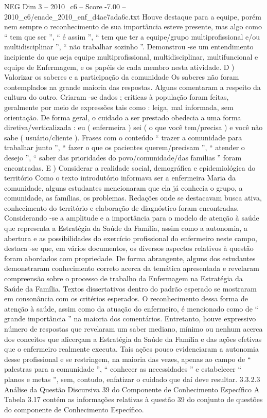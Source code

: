 \begin{textsample}{NEG Dim 3 – 2010\_c6 – Score -7.00 – 2010\_c6/enade\_2010\_enf\_d4ae7ada6c.txt}
Houve destaque para a equipe, porém nem sempre o reconhecimento de sua importância esteve presente, mas algo como “ tem que ser ”, “ é assim ”, “ tem que ter a equipe/grupo multiprofissional e/ou multidisciplinar ”, “ não trabalhar sozinho ”.
Demonstrou -se um entendimento incipiente do que seja equipe multiprofissional, multidisciplinar, multifuncional e equipe de Enfermagem, e os papéis de cada membro nesta atividade.
D ) Valorizar os saberes e a participação da comunidade Os saberes não foram contemplados na grande maioria das respostas.
Alguns comentaram a respeito da cultura do outro.
Criaram -se dados ; críticas à população foram feitas, geralmente por meio de expressões tais como : leiga, mal informada, sem orientação.
De forma geral, o cuidado a ser prestado obedecia a uma forma diretiva/verticalizada : eu ( enfermeira ) sei ( o que você tem/precisa ) e você não sabe ( usuário/cliente ).
Frases com o conteúdo “ trazer a comunidade para trabalhar junto ”, “ fazer o que os pacientes querem/precisam ”, “ atender o desejo ”, “ saber das prioridades do povo/comunidade/das famílias ” foram encontradas.
E ) Considerar a realidade social, demográfica e epidemiológica do território Como o texto introdutório informava ser a enfermeira Maria da comunidade, alguns estudantes mencionaram que ela já conhecia o grupo, a comunidade, as famílias, os problemas.
Redações onde se destacavam busca ativa, conhecimento do território e elaboração de diagnóstico foram encontradas.
Considerando -se a amplitude e a importância para o modelo de atenção à saúde que representa a Estratégia da Saúde da Família, assim como a autonomia, a abertura e as possibilidades do exercício profissional do enfermeiro neste campo, destaca -se que, em vários documentos, os diversos aspectos relativos à questão foram abordados com propriedade.
De forma abrangente, alguns dos estudantes demonstraram conhecimento correto acerca da temática apresentada e revelaram compreensão sobre o processo de trabalho da Enfermagem na Estratégia da Saúde da Família.
Textos dissertativos dentro do padrão esperado se mostraram em consonância com os critérios esperados.
O reconhecimento dessa forma de atenção à saúde, assim como da atuação do enfermeiro, é mencionado como de “ grande importância ” na maioria dos comentários.
Entretanto, houve expressivo número de respostas que revelaram um saber mediano, mínimo ou nenhum acerca dos conceitos que alicerçam a Estratégia da Saúde da Família e das ações efetivas que o enfermeiro realmente executa.
Tais ações pouco evidenciaram a autonomia desse profissional e se restringem, na maioria das vezes, apenas ao campo de “ palestras para a comunidade ”, “ conhecer as necessidades ” e estabelecer “ planos e metas ”, sem, contudo, enfatizar o cuidado que daí deve resultar. 3.3.2.3 Análise da Questão Discursiva 39 do Componente de Conhecimento Específico A Tabela 3.17 contém as informações relativas à questão 39 do conjunto de questões do componente de Conhecimento Específico.

\end{textsample}
